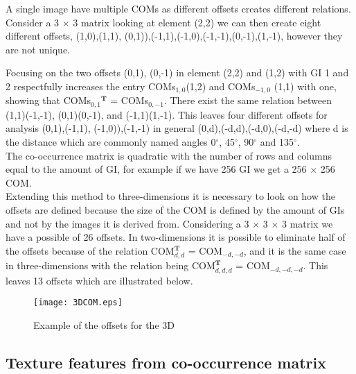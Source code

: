 A single image have multiple COMs as different offsets creates different relations. Consider a 3 $\times$ 3 matrix looking at element (2,2) we can then create eight different offsets, {(1,0),(1,1), (0,1)),(-1,1),(-1,0),(-1,-1),(0,-1),(1,-1)}, however they are not unique. 

Focusing on the two offsets {(0,1), (0,-1)} in element (2,2) and (1,2) with GI 1 and 2 respectfully increases the entry COMs$_{1,0}$(1,2) and COMs$_{-1,0}$ (1,1) with one, showing that COMs$_{0,1}$$^\textbf{T}$ = COMs$_{0,-1}$. There exist the same relation between (1,1)(-1,-1), (0,1)(0,-1), and (-1,1)(1,-1). This leaves four different offsets for analysis {(0,1),(-1,1), (-1,0)),(-1,-1)} in general {(0,d),(-d,d),(-d,0),(-d,-d)} where d is the distance which are commonly named angles 0$^\circ$, 45$^\circ$, 90$^\circ$ and 135$^\circ$.
\\

The co-occurrence matrix is quadratic with the number of rows and columns equal to the amount of GI, for example if we have 256 GI we get a 256 $\times$ 256 COM.
\\

Extending this method to three-dimensions it is necessary to look on how the offsets are defined because the size of the COM is defined by the amount of GIs and not by the images it is derived from. Considering a 3 $\times$ 3 $\times$ 3 matrix we have a possible of 26 offsets. In two-dimensions it is possible to eliminate half of the offsets because of the relation COM$_{d,d}^\textbf{T}$ = COM$_{-d,-d}$, and it is the same case in three-dimensions with the relation being COM$_{d,d,d}^\textbf{T}$ = COM$_{-d,-d,-d}$. This leaves 13 offsets which are illustrated below.\\

\begin{figure}[H]
  \centering
  \texttt{[image: 3DCOM.eps]}
  \caption{Example of the offsets for the 3D}\label{3DCOM}
\end{figure}


\subsection{Texture features from co-occurrence matrix}

